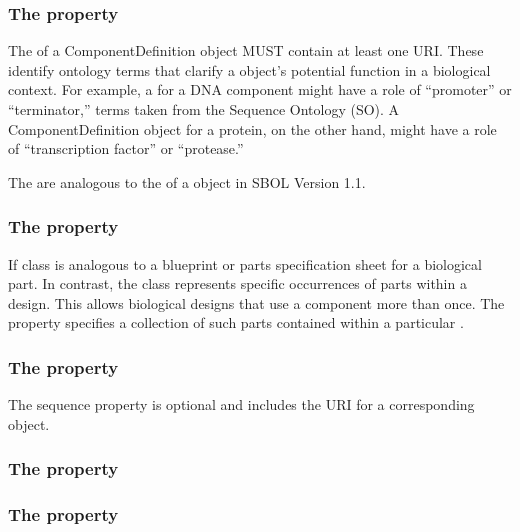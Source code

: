 \subsubsection*{The  property}
\label{sec:roles}

The  of a ComponentDefinition object MUST contain at least one URI.  These identify ontology terms that clarify a  object's potential function in a biological context. For example, a  for a DNA component might have a role of ``promoter'' or ``terminator,'' terms taken from the Sequence Ontology (SO). A ComponentDefinition object for a protein, on the other hand, might have a role of ``transcription factor'' or ``protease.'' 

The  are analogous to the  of a  object in SBOL Version 1.1. 


\subsubsection*{The  property}
\label{sec:components}

If  class is analogous to a blueprint or parts specification sheet for a biological part. In contrast, the  class represents specific occurrences of parts within a design.  This allows biological designs that use a component more than once.
The  property specifies a collection of such parts contained within a particular .


\subsubsection*{The  property}
\label{sec:sequence}
The sequence property is optional and includes the URI for a corresponding  object.

\subsubsection*{The  property}
\label{sec:sequenceConstraint}


\subsubsection*{The  property}
\label{sec:sequenceAnnotation}

